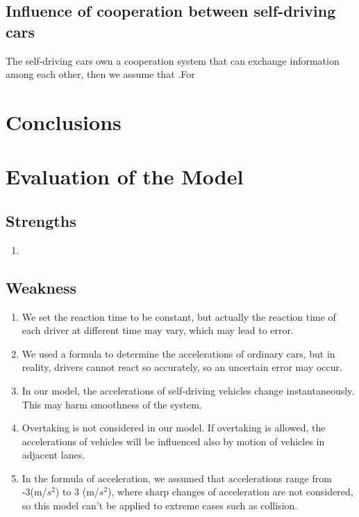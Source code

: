 \documentclass{icmmcm}
\begin{document}
\subsection{Influence of cooperation between self-driving cars}
The self-driving cars own a cooperation system that can exchange information among each other, then we assume that .For %

\section{Conclusions}
\section{Evaluation of the Model}
\subsection{Strengths}
\begin{enumerate}
\item 
\end{enumerate} 
\subsection{Weakness}
\begin{enumerate}
\item We set the reaction time to be constant, but actually the reaction time of each driver at different time may vary, which may lead to error.
\item We used a formula to determine the accelerations of ordinary cars, but in reality, drivers cannot react so accurately, so an uncertain error may occur.
\item In our model, the accelerations of self-driving vehicles change instantaneously. This may harm smoothness of the system.
\item Overtaking is not considered in our model. If overtaking is allowed, the accelerations of vehicles will be influenced also by motion of vehicles in adjacent lanes.
\item In the formula of acceleration, we assumed that accelerations range from -3(m/$s^{2}$) to 3 (m/$s^{2}$), where sharp changes of acceleration are not considered, so this model can't be applied to extreme cases such as collision.
\end{enumerate}







\end{document}
